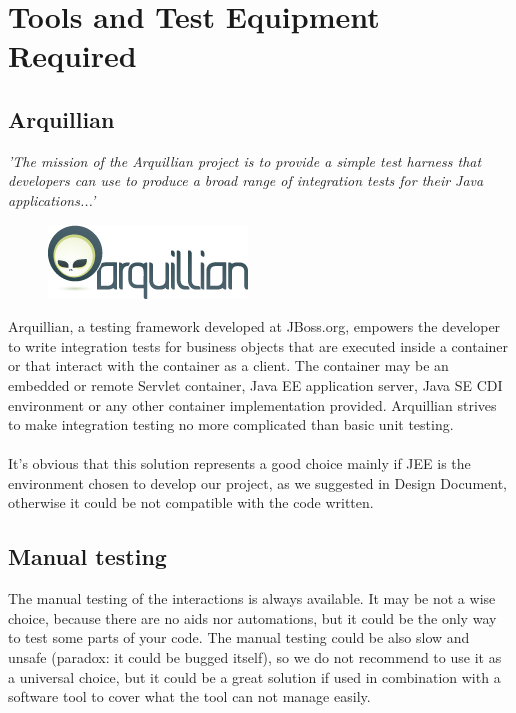 \section{Tools and Test Equipment Required}
	\subsection{Arquillian}
	\textit{'The mission of the Arquillian project is to provide a simple test harness that developers can use
		to produce a broad range of integration tests for their Java applications...'}
	\begin{figure}[h!]
		\begin{center}
			\href{http://arquillian.org/}{\includegraphics[scale=1]{../SE2_IMAGES/arquillian}}
		\end{center}
	\end{figure}
	Arquillian, a testing framework developed at JBoss.org, empowers the developer to write integration
	tests for business objects that are executed inside a container or that interact with the container as a client.
	The container may be an embedded or remote Servlet container, Java EE application server, Java SE CDI
	environment or any other container implementation provided. Arquillian strives to make integration
	testing no more complicated than basic unit testing.
	\\
	\\
	It's obvious that this solution represents a good choice mainly if JEE is the environment chosen to develop
	our project, as we suggested in Design Document, otherwise it could be not compatible with the code written.
	\subsection{Manual testing}
	The manual testing of the interactions is always available. It may be not a wise choice, because there are
	no aids nor automations, but it could be the only way to test some parts of your code. The manual testing
	could be also slow and unsafe (paradox: it could be bugged itself), so we do not recommend to use it as
	a universal choice, but it could be a great solution if used in combination with a software tool to cover
	what the tool can not manage easily.